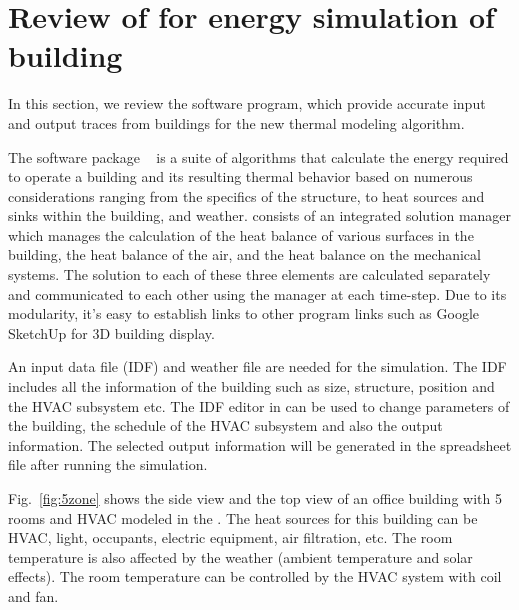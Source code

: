 \section{Review of \EP{} for energy simulation of building} %

In this section, we review the \EP{} software program, which provide
accurate input and output traces from buildings for the new thermal
modeling algorithm.

The \EP{} software package ~\cite{energyplus:2001vf} is a suite of
algorithms that calculate the energy required to operate a building
and its resulting thermal behavior based on numerous considerations
ranging from the specifics of the structure, to heat sources and
sinks within the building, and weather.
\EP{} consists of  an integrated solution
manager which manages the calculation of the heat balance of various
surfaces in the building, the heat balance of the air, and the heat
balance on the mechanical systems. The solution to each of these three
elements are calculated separately and communicated to each other
using the manager at each time-step.
Due to its modularity, it's easy to establish links to other program
links such as Google SketchUp \cite{googlesketchup} for 3D building display.

An input data file (IDF) and weather file are needed for the \EP{}
simulation. The IDF includes all the information of the building such
as size, structure, position and the HVAC subsystem etc. The IDF
editor in \EP{} can be used to change parameters of the building, the
schedule of the HVAC subsystem and also the output information. The
selected output information will be generated in the spreadsheet file
after running the simulation.

Fig.~\ref{fig:5zone} shows the side view and the top view of an office building
with 5 rooms and HVAC modeled in the \EP.  The heat sources for this building
can be HVAC, light, occupants, electric equipment, air filtration, etc. The
room temperature is also affected by the weather (ambient temperature and solar
effects).  The room temperature can be controlled by the HVAC system with coil
and fan.

